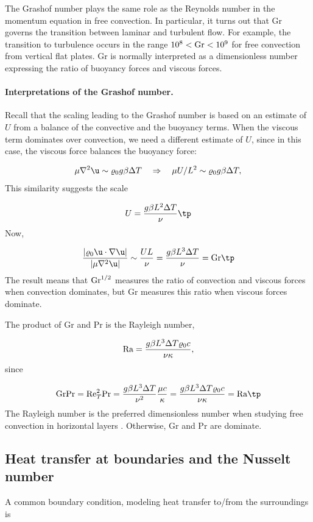 \documentclass[graybox,envcountchap,sectrefs,final]{svmonodo}
\begin{document}
The Grashof number plays the same
role as the Reynolds number in the momentum equation in free
convection. In particular,
it turns out that Gr governs the transition between laminar and
turbulent flow.  For example, the transition to turbulence occurs in
the range $10^8 < \hbox{Gr} < 10^9$ for free convection from vertical
flat plates.  Gr is normally interpreted as a dimensionless number
expressing the ratio of buoyancy forces and viscous forces.

\paragraph{Interpretations of the Grashof number.}
Recall that the scaling leading to the Grashof number is based on an
estimate of $U$ from a balance of the convective and the buoyancy
terms. When the viscous term dominates over convection, we need a
different estimate of $U$, since in this case, the viscous force
balances the buoyancy force:

\[ \mu\nabla^2\u \sim \varrho_0g\beta\Delta T\quad
\Rightarrow\quad \mu U/L^2 \sim \varrho_0g\beta\Delta T,\]
This similarity suggests the scale

\[ U = \frac{g\beta L^2 \Delta T}{\nu}\tp\]
Now,

\[ \frac{|\varrho_0\u\cdot\nabla\u|}{|\mu\nabla^2\u|} \sim \frac{UL}{\nu}
= \frac{g\beta L^3 \Delta T}{\nu} = \hbox{Gr}\tp\]
The result means that $\hbox{Gr}^{1/2}$ measures the ratio of convection and
viscous forces when convection dominates, but Gr measures this ratio when
viscous forces dominate.

The product of Gr and Pr is the Rayleigh number,

\[
\hbox{Ra} = \frac{g\beta L^3\Delta T\varrho_0 c}{\nu\kappa},
\]
since

\[
\hbox{Gr} \hbox{Pr} = \hbox{Re}_T^2\hbox{Pr} =
\frac{g\beta L^3 \Delta T}{\nu^2}\frac{\mu c}{\kappa} =
\frac{g\beta L^3 \Delta T\varrho_0 c}{\nu\kappa} =
\hbox{Ra}\tp
\]
The Rayleigh number is the preferred dimensionless number when studying
free convection in horizontal layers \cite{Drazin_Reid,Tritton}. Otherwise,
Gr and Pr are dominate.


\subsection{Heat transfer at boundaries and the Nusselt number}


A common boundary condition, modeling heat transfer to/from the
surroundings is
\end{document}
